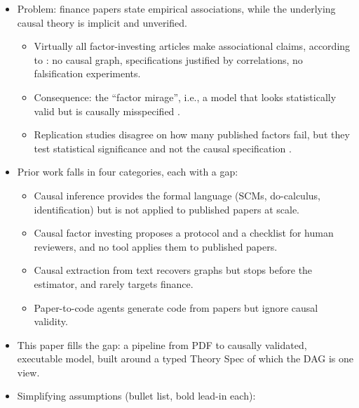   \begin{itemize}
  \tightlist
  \item
    Problem: finance papers state empirical associations, while the
    underlying causal theory is implicit and unverified.

    \begin{itemize}
    \tightlist
    \item
      Virtually all factor-investing articles make associational claims,
      according to \cite{lopezdeprado2023causal}: no causal graph,
      specifications justified by correlations, no falsification
      experiments.
    \item
      Consequence: the ``factor mirage'', i.e., a model that looks
      statistically valid but is causally misspecified
      \cite{lopezdeprado2024mirage,lopezdeprado2025primer}.
    \item
      Replication studies disagree on how many published factors fail, but
      they test statistical significance and not the causal specification
      \cite{harvey2016cross,hou2020replicating,jensen2023replication}.
    \end{itemize}
  \item
    Prior work falls in four categories, each with a gap:

    \begin{itemize}
    \tightlist
    \item
      Causal inference provides the formal language (SCMs, do-calculus,
      identification) but is not applied to published papers at scale.
    \item
      Causal factor investing proposes a protocol and a checklist for human
      reviewers, and no tool applies them to published papers.
    \item
      Causal extraction from text recovers graphs but stops before the
      estimator, and rarely targets finance.
    \item
      Paper-to-code agents generate code from papers but ignore causal
      validity.
    \end{itemize}
  \item
    This paper fills the gap: a pipeline from PDF to causally validated,
    executable model, built around a typed Theory Spec of which the DAG is
    one view.
  \item
    Simplifying assumptions (bullet list, bold lead-in each):


\end{itemize}

